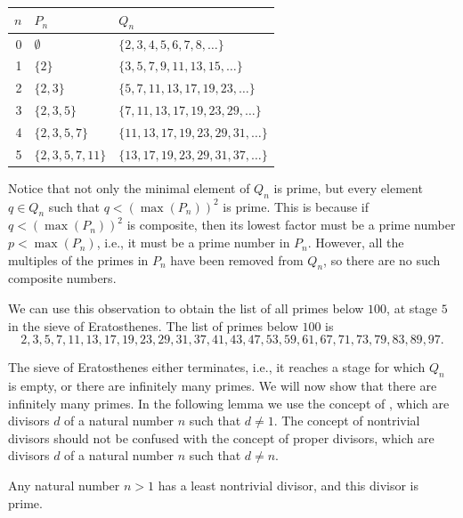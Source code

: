 \begin{center}
  \renewcommand{\arraystretch}{1.2} %
  \setlength{\tabcolsep}{10pt}      %
  \begin{tabular}{r|l l}
    \textbf{$n$} & \textbf{$P_n$} & \textbf{$Q_n$} \\ \hline
    0 & $\emptyset$ & $\{2,3,4,5,6,7,8,\ldots\}$ \\
    1 & $\{2\}$ & $\{3,5,7,9,11,13,15,\ldots\}$ \\
    2 & $\{2,3\}$ & $\{5,7,11,13,17,19,23,\ldots\}$ \\
    3 & $\{2,3,5\}$ & $\{7,11,13,17,19,23,29,\ldots\}$ \\
    4 & $\{2,3,5,7\}$ & $\{11,13,17,19,23,29,31,\ldots\}$ \\
    5 & $\{2,3,5,7,11\}$ & $\{13,17,19,23,29,31,37,\ldots\}$ \\
  \end{tabular}
\end{center}

Notice that not only the minimal element of $Q_n$ is prime, but every element $q\in Q_n$ such that $q<(\max(P_n))^2$ is prime. This is because if $q<(\max(P_n))^2$ is composite, then its lowest factor must be a prime number $p<\max(P_n)$, i.e., it must be a prime number in $P_n$. However, all the multiples of the primes in $P_n$ have been removed from $Q_n$, so there are no such composite numbers.

We can use this observation to obtain the list of all primes below $100$, at stage $5$ in the sieve of Eratosthenes. The list of primes below $100$ is
\begin{equation*}
2,3,5,7,11,13,17,19,23,29,31,37,41,43,47,53,59,61,67,71,73,79,83,89,97.
\end{equation*}

The sieve of Eratosthenes either terminates, i.e., it reaches a stage for which $Q_n$ is empty, or there are infinitely many primes. We will now show that there are infinitely many primes. In the following lemma we use the concept of , which are divisors $d$ of a natural number $n$ such that $d\neq 1$. The concept of nontrivial divisors should not be confused with the concept of proper divisors, which are divisors $d$ of a natural number $n$ such that $d\neq n$.

\begin{theorem}
  Any natural number $n>1$ has a least nontrivial divisor, and this divisor is prime.
\end{theorem}

